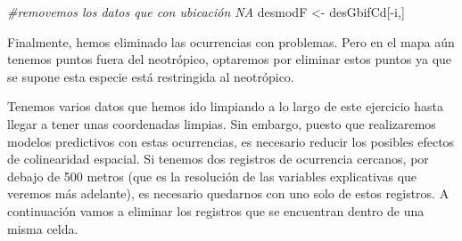 \documentclass[]{article}
\newenvironment{Shaded}{\begin{snugshade}}{\end{snugshade}}
\newcommand{\KeywordTok}[1]{\textcolor[rgb]{0.13,0.29,0.53}{\textbf{{#1}}}}
\newcommand{\DecValTok}[1]{\textcolor[rgb]{0.00,0.00,0.81}{{#1}}}
\newcommand{\StringTok}[1]{\textcolor[rgb]{0.31,0.60,0.02}{{#1}}}
\newcommand{\CommentTok}[1]{\textcolor[rgb]{0.56,0.35,0.01}{\textit{{#1}}}}
\newcommand{\NormalTok}[1]{{#1}}
\begin{document}
\begin{Shaded}
\begin{Highlighting}[]
\CommentTok{#removemos los datos que con ubicación NA}
\NormalTok{desmodF <-}\StringTok{ }\NormalTok{desGbifCd[-i,]}
\end{Highlighting}
\end{Shaded}

Finalmente, hemos eliminado las ocurrencias con problemas. Pero en el
mapa aún tenemos puntos fuera del neotrópico, optaremos por eliminar
estos puntos ya que se supone esta especie está restringida al
neotrópico.

\begin{Shaded}
\end{Shaded}

Tenemos varios datos que hemos ido limpiando a lo largo de este
ejercicio hasta llegar a tener unas coordenadas limpias. Sin embargo,
puesto que realizaremos modelos predictivos con estas ocurrencias, es
necesario reducir los posibles efectos de colinearidad espacial. Si
tenemos dos registros de ocurrencia cercanos, por debajo de 500 metros
(que es la resolución de las variables explicativas que veremos más
adelante), es necesario quedarnos con uno solo de estos registros. A
continuación vamos a eliminar los registros que se encuentran dentro de
una misma celda.
\end{document}
